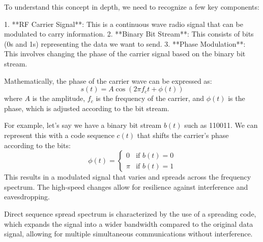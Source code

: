 To understand this concept in depth, we need to recognize a few key components:

1. **RF Carrier Signal**: This is a continuous wave radio signal that can be modulated to carry information.
2. **Binary Bit Stream**: This consists of bits (0s and 1s) representing the data we want to send.
3. **Phase Modulation**: This involves changing the phase of the carrier signal based on the binary bit stream.

Mathematically, the phase of the carrier wave can be expressed as:
\[
s(t) = A \cos(2 \pi f_c t + \phi(t))
\]
where \(A\) is the amplitude, \(f_c\) is the frequency of the carrier, and \(\phi(t)\) is the phase, which is adjusted according to the bit stream.

For example, let’s say we have a binary bit stream \(b(t)\) such as 110011. We can represent this with a code sequence \(c(t)\) that shifts the carrier's phase according to the bits:
\[
\phi(t) = \begin{cases} 
0 & \text{if } b(t) = 0 \\ 
\pi & \text{if } b(t) = 1 
\end{cases}
\]
This results in a modulated signal that varies and spreads across the frequency spectrum. The high-speed changes allow for resilience against interference and eavesdropping.

Direct sequence spread spectrum is characterized by the use of a spreading code, which expands the signal into a wider bandwidth compared to the original data signal, allowing for multiple simultaneous communications without interference.

